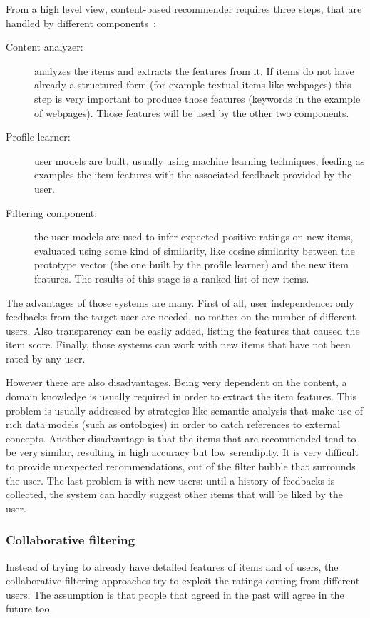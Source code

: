 From a high level view, content-based recommender requires three steps, that are handled by different components~\cite{lops2011content}:

\begin{description}
	\item[Content analyzer:] analyzes the items and extracts the features from it. If items do not have already a structured form (for example textual items like webpages) this step is very important to produce those features (keywords in the example of webpages). Those features will be used by the other two components.
	\item[Profile learner:] user models are built, usually using machine learning techniques, feeding as examples the item features with the associated feedback provided by the user.
	\item[Filtering component:] the user models are used to infer expected positive ratings on new items, evaluated using some kind of similarity, like cosine similarity between the prototype vector (the one built by the profile learner) and the new item features. The results of this stage is a ranked list of new items.
\end{description}
The advantages of those systems are many. First of all, user independence: only feedbacks from the target user are needed, no matter on the number of different users. Also transparency can be easily added, listing the features that caused the item score. Finally, those systems can work with new items that have not been rated by any user.

However there are also disadvantages. Being very dependent on the content, a domain knowledge is usually required in order to extract the item features. This problem is usually addressed by strategies like semantic analysis that make use of rich data models (such as ontologies) in order to catch references to external concepts. Another disadvantage is that the items that are recommended tend to be very similar, resulting in high accuracy but low serendipity. It is very difficult to provide unexpected recommendations, out of the filter bubble that surrounds the user. The last problem is with new users: until a history of feedbacks is collected, the system can hardly suggest other items that will be liked by the user.

\subsubsection{Collaborative filtering}
Instead of trying to already have detailed features of items and of users, the collaborative filtering approaches try to exploit the ratings coming from different users. The assumption is that people that agreed in the past will agree in the future too.

